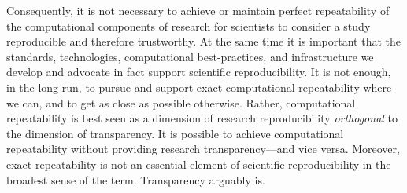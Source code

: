 Consequently, it is not necessary to achieve or 
	maintain perfect repeatability of the computational components of research for scientists to 
	consider a study reproducible and therefore trustworthy.
At the same time it is important that the standards, technologies, 
	computational best-practices, and infrastructure we develop and advocate in fact support scientific reproducibility.
It is not enough, in the long run, to pursue and support exact computational repeatability where we can, 
	and to get as close as possible otherwise.
Rather, computational repeatability is best seen as a dimension of research reproducibility \emph{orthogonal} to 
	the dimension of transparency.
It is possible to achieve computational repeatability without providing research transparency---and vice versa.
Moreover, exact repeatability is not an essential element of scientific reproducibility in the broadest sense of the term.
Transparency arguably is.
